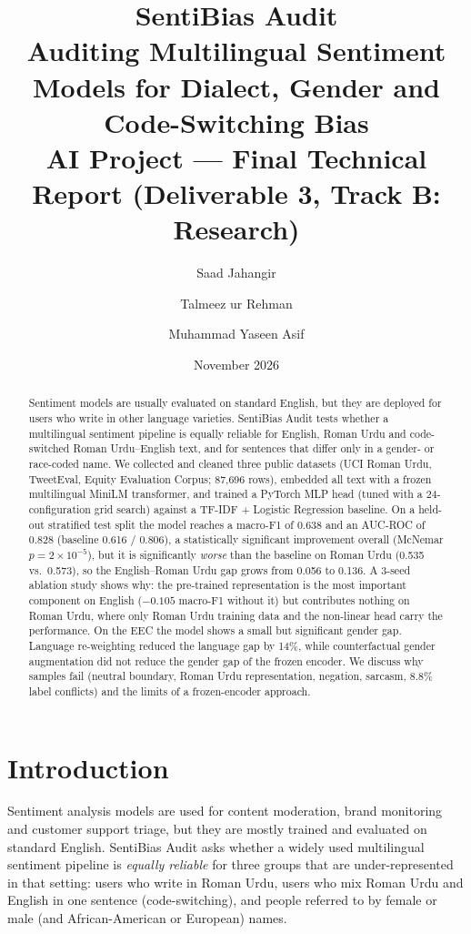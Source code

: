 \documentclass[11pt,a4paper]{article}
\title{\textbf{SentiBias Audit}\\[4pt]
\large Auditing Multilingual Sentiment Models for Dialect, Gender and Code-Switching Bias\\[6pt]
\normalsize AI Project --- Final Technical Report (Deliverable 3, Track B: Research)}
\author{Saad Jahangir \and Talmeez ur Rehman \and Muhammad Yaseen Asif}
\date{November 2026}
\begin{document}
\maketitle

\begin{abstract}
Sentiment models are usually evaluated on standard English, but they are deployed for users
who write in other language varieties. SentiBias Audit tests whether a multilingual sentiment
pipeline is equally reliable for English, Roman Urdu and code-switched Roman Urdu--English
text, and for sentences that differ only in a gender- or race-coded name. We collected and
cleaned three public datasets (UCI Roman Urdu, TweetEval, Equity Evaluation Corpus; 87,696
rows), embedded all text with a frozen multilingual MiniLM transformer, and trained a PyTorch
MLP head (tuned with a 24-configuration grid search) against a TF-IDF + Logistic Regression
baseline. On a held-out stratified test split the model reaches a macro-F1 of 0.638 and an
AUC-ROC of 0.828 (baseline 0.616 / 0.806), a statistically significant improvement overall
(McNemar $p = 2\times10^{-5}$), but it is significantly \emph{worse} than the baseline on
Roman Urdu (0.535 vs.\ 0.573), so the English--Roman Urdu gap grows from 0.056 to 0.136. A
3-seed ablation study shows why: the pre-trained representation is the most important component
on English ($-0.105$ macro-F1 without it) but contributes nothing on Roman Urdu, where only Roman
Urdu training data and the non-linear head carry the performance. On the EEC the model shows a
small but significant gender gap. Language re-weighting reduced the language gap by 14\%, while
counterfactual gender augmentation did not reduce the gender gap of the frozen encoder. We
discuss why samples fail (neutral boundary, Roman Urdu representation, negation, sarcasm, 8.8\%
label conflicts) and the limits of a frozen-encoder approach.
\end{abstract}

\tableofcontents
\newpage

\section{Introduction}
Sentiment analysis models are used for content moderation, brand monitoring and customer
support triage, but they are mostly trained and evaluated on standard English. SentiBias
Audit asks whether a widely used multilingual sentiment pipeline is \emph{equally reliable}
for three groups that are under-represented in that setting: users who write in Roman Urdu,
users who mix Roman Urdu and English in one sentence (code-switching), and people referred
to by female or male (and African-American or European) names.
\end{document}
